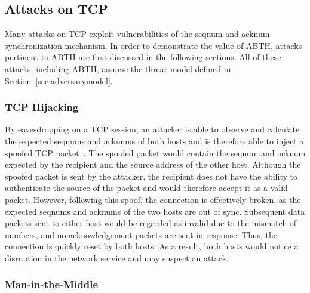 \documentclass{sig-alternate}
\begin{document}
\subsection{Attacks on TCP}

Many attacks on TCP exploit vulnerabilities of the seqnum and acknum synchronization mechanism.
In order to demonstrate the value of ABTH, attacks pertinent to ABTH are first discussed in the following sections.
All of these attacks, including ABTH, assume the threat model defined in Section~\ref{sec:adversarymodel}.

\subsubsection{TCP Hijacking}

By eavesdropping on a TCP session, an attacker is able to observe and calculate the expected seqnums and acknums of both hosts and is therefore able to inject a spoofed TCP packet~\cite{harris:tcpattacks}.
The spoofed packet would contain the seqnum and acknum expected by the recipient and the source address of the other host.
Although the spoofed packet is sent by the attacker, the recipient does not have the ability to authenticate the source of the packet and would therefore accept it as a valid packet.
However, following this spoof, the connection is effectively broken, as the expected seqnums and acknums of the two hosts are out of sync.
Subsequent data packets sent to either host would be regarded as invalid due to the mismatch of numbers, and no acknowledgement packets are sent in response.
Thus, the connection is quickly reset by both hosts.
As a result, both hosts would notice a disruption in the network service and may suspect an attack.

\subsubsection{Man-in-the-Middle}
\end{document}
